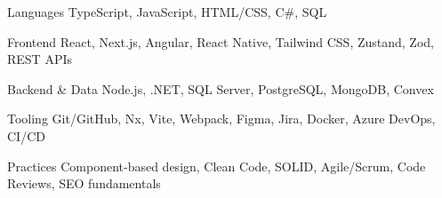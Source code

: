 

\begin{cvskills}

  \cvskill
    {Languages} %
    {TypeScript, JavaScript, HTML/CSS, C\#, SQL} %

  \cvskill
    {Frontend} %
    {React, Next.js, Angular, React Native, Tailwind CSS, Zustand, Zod, REST APIs} %

  \cvskill
    {Backend \& Data} %
    {Node.js, .NET, SQL Server, PostgreSQL, MongoDB, Convex} %

  \cvskill
    {Tooling} %
    {Git/GitHub, Nx, Vite, Webpack, Figma, Jira, Docker, Azure DevOps, CI/CD} %

  \cvskill
    {Practices} %
    {Component-based design, Clean Code, SOLID, Agile/Scrum, Code Reviews, SEO fundamentals} %

\end{cvskills}
